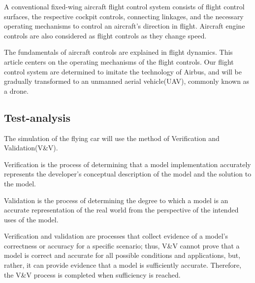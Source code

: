 A conventional fixed-wing aircraft flight control system consists of flight control surfaces, the respective cockpit controls, connecting linkages, and the necessary operating mechanisms to control an aircraft's direction in flight. Aircraft engine controls are also considered as flight controls as they change speed.

The fundamentals of aircraft controls are explained in flight dynamics. This article centers on the operating mechanisms of the flight controls. Our flight control system are determined to imitate the technology of Airbus, and will be gradually transformed to an unmanned aerial vehicle(UAV), commonly known as a drone.

\subsection{Test-analysis}

The simulation of the flying car will use the method of Verification and Validation(V\&V).

Verification is the process of determining that a model implementation accurately represents the developer’s conceptual description of the model and the solution to the model.

Validation is the process of determining the degree to which a model is an accurate representation of the real world from the perspective of the intended uses of the model.

Verification and validation are processes that collect evidence of a model’s correctness or accuracy for a specific scenario; thus, V\&V cannot prove that a model is correct and accurate for all possible conditions and applications, but, rather, it can provide evidence that a model is sufficiently accurate. Therefore, the V\&V process is completed when sufficiency is reached.
